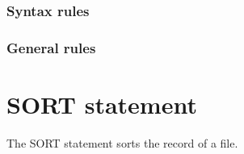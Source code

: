 \begin{syntax}
      
\end{syntax}

\begin{syntax}[\miscextcolour]
\end{syntax}

\subsubsection{Syntax rules}

\subsubsection{General rules}

\section{SORT statement}

The SORT statement sorts the record of a file.


